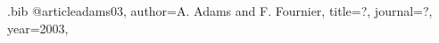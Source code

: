 
\begin{filecontents*}{\jobname.bib}
@article{adams03,
 author={A. Adams and F. Fournier},
 title={?},
 journal={?},
 year=2003,
}
\end{filecontents*}
\documentclass{article}

\usepackage[american]{babel}
\usepackage[utf8]{inputenc}
\usepackage{natbib}



\citep{adams03,collier09}

\citep[p.~3]{adams03}

(\citeauthor{adams03}, \citeyear{adams03}, p.~3; \citeauthor{collier09}, \citeyear{collier09}, p.~5).





